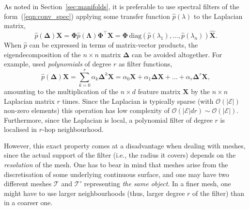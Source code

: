 As noted in Section~\ref{sec:manifolds}, it is preferable to use spectral filters of the form~(\ref{eqn:conv_spec}) applying some transfer function $\hat{p}(\lambda)$ to the Laplacian matrix, 
$$
\hat{p}(\boldsymbol{\Delta})\mathbf{X} = \boldsymbol{\Phi} \hat{p}(\boldsymbol{\Lambda})\boldsymbol{\Phi}^\top\mathbf{X} 
= \boldsymbol{\Phi}\, \mathrm{diag}(\hat{p}(\lambda_1), \hdots, \hat{p}(\lambda_n)) \hat{\mathbf{X}}. 
$$
%
%
When $\hat{p}$ can be expressed in terms of matrix-vector products, the eigendecomposition of the $n\times n$ matrix $\boldsymbol{\Delta}$  can be avoided altogether.  
%
For example, \cite{defferrard2016convolutional} used  {\em polynomials} of degree $r$ as filter functions, %
$$
\hat{p}(\boldsymbol{\Delta})\mathbf{X} = \sum_{k=0}^r \alpha_k \boldsymbol{\Delta}^k \mathbf{X}  = \alpha_0 \mathbf{X} + \alpha_1 \boldsymbol{\Delta} \mathbf{X}  + \hdots + \alpha_r \boldsymbol{\Delta}^r \mathbf{X}, 
$$
amounting to the multiplication of the $n\times d$ feature matrix $\mathbf{X}$ by the $n\times n$ Laplacian matrix $r$ times. Since the Laplacian is typically sparse (with $\mathcal{O}(|\mathcal{E}|)$ non-zero elements) 
%
this operation has low complexity of $\mathcal{O}(|\mathcal{E}|dr)\sim \mathcal{O}(|\mathcal{E}|)$. 
%
Furthermore, since the Laplacian is local,  %
a polynomial filter of degree $r$ is localised in $r$-hop neighbourhood. 


However, this exact property comes at a disadvantage when dealing with meshes, since the actual support of the filter (i.e., the radius it covers) depends on the {\em resolution} of the mesh. 
%
One has to bear in mind that meshes arise from the discretisation of some underlying continuous surface, and one may have two different meshes $\mathcal{T}$ and $\mathcal{T}'$ representing {\em the same object}.  
%
In a finer mesh, one might have to use larger neighbourhoods (thus, larger degree $r$ of the filter) than in a coarser one. 
%

